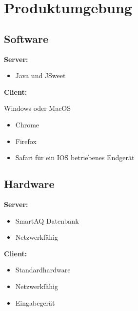 \section{Produktumgebung}
\subsection{Software}
\item \textbf{Server:}
\begin{itemize}
    \item Java und JSweet
\end{itemize}
\item \textbf{ Client:}
\item Windows oder MacOS 
\begin{itemize}
    \item Chrome
    \item Firefox 
    \item Safari für ein IOS betriebenes \Gls{Endgerät}
\end{itemize}
\subsection{Hardware}
\item \textbf{Server:}
\begin{itemize}
    \item SmartAQ Datenbank
    \item Netzwerkfähig 
\end{itemize}
\item \textbf{Client:}
\begin{itemize}
    \item Standardhardware
    \item Netzwerkfähig 
    \item Eingabegerät
\end{itemize}